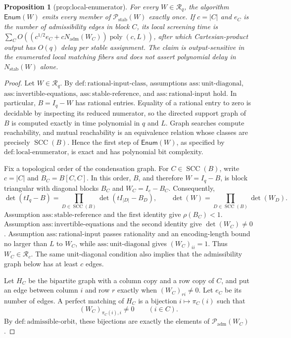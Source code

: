 \documentclass{article}
\newtheorem{proposition}{Proposition}
\begin{document}
\begin{proposition}[prop:local-enumerator]\label{prop:local-enumerator}
For every \(W\in\mathcal R_q\), the algorithm \(\mathsf{Enum}(W)\) emits every member of \(\mathcal P_{\mathrm{stab}}(W)\) exactly once. If \(c=|C|\) and \(e_C\) is the number of admissibility edges in block \(C\), its local screening time is \(\sum_C O((c^{1/2}e_C+cN_{\mathrm{adm}}(W_C))\operatorname{poly}(c,L))\), after which Cartesian-product output has \(O(q)\) delay per stable assignment. The claim is output-sensitive in the enumerated local matching fibers and does not assert polynomial delay in \(N_{\mathrm{stab}}(W)\) alone.
\end{proposition}
\begin{proof}
Let \(W\in\mathcal R_q\).  By \(\mathrm{def:rational\mbox{-}input\mbox{-}class}\), assumptions \(\mathrm{ass:unit\mbox{-}diagonal}\), \(\mathrm{ass:invertible\mbox{-}equations}\), \(\mathrm{ass:stable\mbox{-}reference}\), and \(\mathrm{ass:rational\mbox{-}input}\) hold.  In particular, \(B=I_q-W\) has rational entries.  Equality of a rational entry to zero is decidable by inspecting its reduced numerator, so the directed support graph of \(B\) is computed exactly in time polynomial in \(q\) and \(L\).  Graph searches compute reachability, and mutual reachability is an equivalence relation whose classes are precisely \(\operatorname{SCC}(B)\).  Hence the first step of \(\mathsf{Enum}(W)\), as specified by \(\mathrm{def:local\mbox{-}enumerator}\), is exact and has polynomial bit complexity.

Fix a topological order of the condensation graph.  For \(C\in\operatorname{SCC}(B)\), write \(c=|C|\) and \(B_C=B[C,C]\).  In this order, \(B\), and therefore \(W=I_q-B\), is block triangular with diagonal blocks \(B_C\) and \(W_C=I_c-B_C\).  Consequently,
\[
 \det(tI_q-B)=\prod_{D\in\operatorname{SCC}(B)}
 \det(tI_{|D|}-B_D),
 \qquad
 \det(W)=\prod_{D\in\operatorname{SCC}(B)}\det(W_D).
\]
Assumption \(\mathrm{ass:stable\mbox{-}reference}\) and the first identity give \(\rho(B_C)<1\).  Assumption \(\mathrm{ass:invertible\mbox{-}equations}\) and the second identity give \(\det(W_C)\ne0\).  Assumption \(\mathrm{ass:rational\mbox{-}input}\) passes rationality and an encoding-length bound no larger than \(L\) to \(W_C\), while \(\mathrm{ass:unit\mbox{-}diagonal}\) gives \((W_C)_{ii}=1\).  Thus \(W_C\in\mathcal R_c\).  The same unit-diagonal condition also implies that the admissibility graph below has at least \(c\) edges.

Let \(H_C\) be the bipartite graph with a column copy and a row copy of \(C\), and put an edge between column \(i\) and row \(r\) exactly when \((W_C)_{ri}\ne0\).  Let \(e_C\) be its number of edges.  A perfect matching of \(H_C\) is a bijection \(i\mapsto\pi_C(i)\) such that
\[
 (W_C)_{\pi_C(i),i}\ne0\qquad(i\in C).
\]
By \(\mathrm{def:admissible\mbox{-}orbit}\), these bijections are exactly the elements of \(\mathcal P_{\mathrm{adm}}(W_C)\).


\end{proof}
\end{document}
